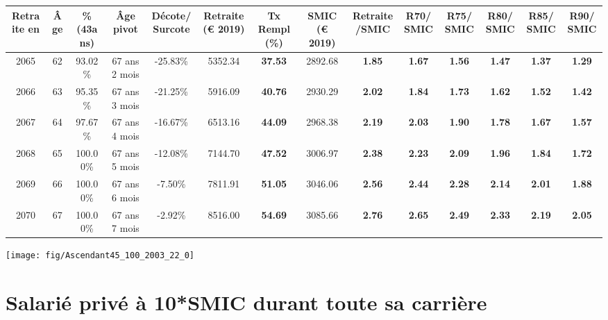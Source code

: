 \begin{adjustbox}{max width=\textwidth} 
\begin{tabular}[htb]{|c|c||c|c|c||c|c||c|c||c|c|c|c|c|} 
\hline 
 Retraite en &  Âge &  \%(43ans) &  Âge pivot &  Décote/Surcote &  Retraite (\euro{} 2019) &  Tx Rempl(\%) &  SMIC (\euro{} 2019) &  Retraite/SMIC &  R70/SMIC &  R75/SMIC &  R80/SMIC &  R85/SMIC &  R90/SMIC \\ 
\hline \hline 
 2065 &  62 &  93.02\% &  67 ans 2 mois &  -25.83\% &  5352.34 &  {\bf 37.53} &  2892.68 &  {\bf 1.85} &  {\bf 1.67} &  {\bf 1.56} &  {\bf 1.47} &  {\bf 1.37} &  {\bf 1.29} \\ 
\hline 
 2066 &  63 &  95.35\% &  67 ans 3 mois &  -21.25\% &  5916.09 &  {\bf 40.76} &  2930.29 &  {\bf 2.02} &  {\bf 1.84} &  {\bf 1.73} &  {\bf 1.62} &  {\bf 1.52} &  {\bf 1.42} \\ 
\hline 
 2067 &  64 &  97.67\% &  67 ans 4 mois &  -16.67\% &  6513.16 &  {\bf 44.09} &  2968.38 &  {\bf 2.19} &  {\bf 2.03} &  {\bf 1.90} &  {\bf 1.78} &  {\bf 1.67} &  {\bf 1.57} \\ 
\hline 
 2068 &  65 &  100.00\% &  67 ans 5 mois &  -12.08\% &  7144.70 &  {\bf 47.52} &  3006.97 &  {\bf 2.38} &  {\bf 2.23} &  {\bf 2.09} &  {\bf 1.96} &  {\bf 1.84} &  {\bf 1.72} \\ 
\hline 
 2069 &  66 &  100.00\% &  67 ans 6 mois &  -7.50\% &  7811.91 &  {\bf 51.05} &  3046.06 &  {\bf 2.56} &  {\bf 2.44} &  {\bf 2.28} &  {\bf 2.14} &  {\bf 2.01} &  {\bf 1.88} \\ 
\hline 
 2070 &  67 &  100.00\% &  67 ans 7 mois &  -2.92\% &  8516.00 &  {\bf 54.69} &  3085.66 &  {\bf 2.76} &  {\bf 2.65} &  {\bf 2.49} &  {\bf 2.33} &  {\bf 2.19} &  {\bf 2.05} \\ 
\hline 
\hline 
\end{tabular} 
\end{adjustbox} 
 
 \vspace{0.1cm} 

 {\hspace{-2.2cm}\texttt{[image: fig/Ascendant45\_100\_2003\_22\_0]}} 

\newpage 
 
\chapter{Salarié privé à 10*SMIC durant toute sa carrière} 

~\\ 
 
